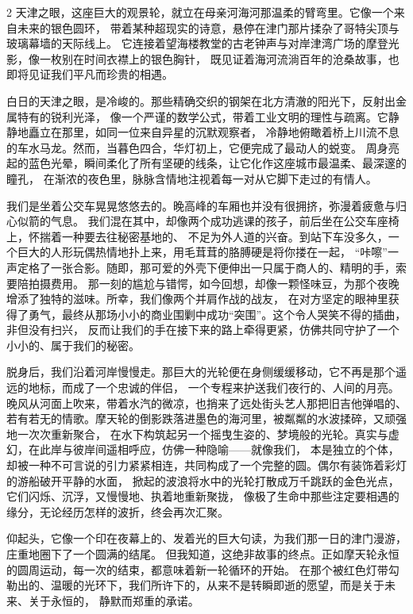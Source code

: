 \large
\begin{spacing}{2}
    天津之眼，这座巨大的观景轮，就立在母亲河海河那温柔的臂弯里。它像一个来自未来的银色圆环，
    带着某种超现实的诗意，悬停在津门那片揉杂了哥特尖顶与玻璃幕墙的天际线上。
    它连接着望海楼教堂的古老钟声与对岸津湾广场的摩登光影，像一枚别在时间衣襟上的银色胸针，
    既见证着海河流淌百年的沧桑故事，也即将见证我们平凡而珍贵的相遇。

    白日的天津之眼，是冷峻的。那些精确交织的钢架在北方清澈的阳光下，反射出金属特有的锐利光泽，
    像一个严谨的数学公式，带着工业文明的理性与疏离。它静静地矗立在那里，如同一位来自异星的沉默观察者，
    冷静地俯瞰着桥上川流不息的车水马龙。然而，当暮色四合，华灯初上，它便完成了最动人的蜕变。
    周身亮起的蓝色光晕，瞬间柔化了所有坚硬的线条，让它化作这座城市最温柔、最深邃的瞳孔，
    在渐浓的夜色里，脉脉含情地注视着每一对从它脚下走过的有情人。

    我们是坐着公交车晃晃悠悠去的。晚高峰的车厢也并没有很拥挤，弥漫着疲惫与归心似箭的气息。
    我们混在其中，却像两个成功逃课的孩子，前后坐在公交车座椅上，怀揣着一种要去往秘密基地的、
    不足为外人道的兴奋。到站下车没多久，一个巨大的人形玩偶热情地扑上来，用毛茸茸的胳膊硬是将你搂在一起，
    “咔嚓”一声定格了一张合影。随即，那可爱的外壳下便伸出一只属于商人的、精明的手，索要陪拍摄费用。
    那一刻的尴尬与错愕，如今回想，却像一颗怪味豆，为那个夜晚增添了独特的滋味。所幸，我们像两个并肩作战的战友，
    在对方坚定的眼神里获得了勇气，最终从那场小小的商业围剿中成功“突围”。这个令人哭笑不得的插曲，非但没有扫兴，
    反而让我们的手在接下来的路上牵得更紧，仿佛共同守护了一个小小的、属于我们的秘密。

    脱身后，我们沿着河岸慢慢走。那巨大的光轮便在身侧缓缓移动，它不再是那个遥远的地标，而成了一个忠诚的伴侣，
    一个专程来护送我们夜行的、人间的月亮。晚风从河面上吹来，带着水汽的微凉，也捎来了远处街头艺人那把旧吉他弹唱的、
    若有若无的情歌。摩天轮的倒影跌落进墨色的海河里，被粼粼的水波揉碎，又顽强地一次次重新聚合，
    在水下构筑起另一个摇曳生姿的、梦境般的光轮。真实与虚幻，在此岸与彼岸间遥相呼应，仿佛一种隐喻——就像我们，
    本是独立的个体，却被一种不可言说的引力紧紧相连，共同构成了一个完整的圆。偶尔有装饰着彩灯的游船破开平静的水面，
    掀起的波浪将水中的光轮打散成万千跳跃的金色光点，它们闪烁、沉浮，又慢慢地、执着地重新聚拢，
    像极了生命中那些注定要相遇的缘分，无论经历怎样的波折，终会再次汇聚。

    仰起头，它像一个印在夜幕上的、发着光的巨大句读，为我们那一日的津门漫游，庄重地圈下了一个圆满的结尾。
    但我知道，这绝非故事的终点。正如摩天轮永恒的圆周运动，每一次的结束，都意味着新一轮循环的开始。
    在那个被红色灯带勾勒出的、温暖的光环下，我们所许下的，从来不是转瞬即逝的愿望，而是关于未来、关于永恒的，
    静默而郑重的承诺。



\end{spacing}

